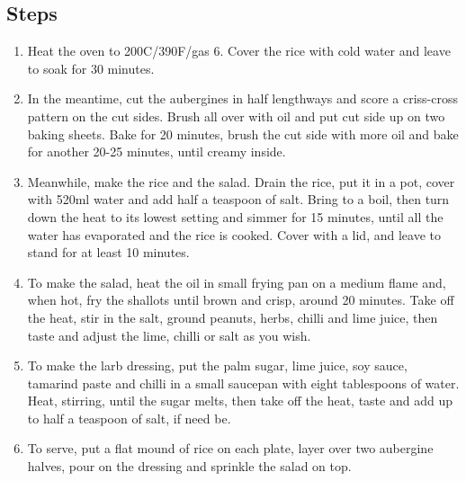 \documentclass{book}
\begin{document}
\subsection*{Steps}
\begin{enumerate}
\item Heat the oven to 200C/390F/gas 6. Cover the rice with cold water and leave to soak for 30 minutes.
\item In the meantime, cut the aubergines in half lengthways and score a criss-cross pattern on the cut sides. Brush all over with oil and put cut side up on two baking sheets. Bake for 20 minutes, brush the cut side with more oil and bake for another 20-25 minutes, until creamy inside.
\item Meanwhile, make the rice and the salad. Drain the rice, put it in a pot, cover with 520ml water and add half a teaspoon of salt. Bring to a boil, then turn down the heat to its lowest setting and simmer for 15 minutes, until all the water has evaporated and the rice is cooked. Cover with a lid, and leave to stand for at least 10 minutes.
\item To make the salad, heat the oil in small frying pan on a medium flame and, when hot, fry the shallots until brown and crisp, around 20 minutes. Take off the heat, stir in the salt, ground peanuts, herbs, chilli and lime juice, then taste and adjust the lime, chilli or salt as you wish.
\item To make the larb dressing, put the palm sugar, lime juice, soy sauce, tamarind paste and chilli in a small saucepan with eight tablespoons of water. Heat, stirring, until the sugar melts, then take off the heat, taste and add up to half a teaspoon of salt, if need be.
\item To serve, put a flat mound of rice on each plate, layer over two aubergine halves, pour on the dressing and sprinkle the salad on top.
\end{enumerate}
\newpage
\end{document}
